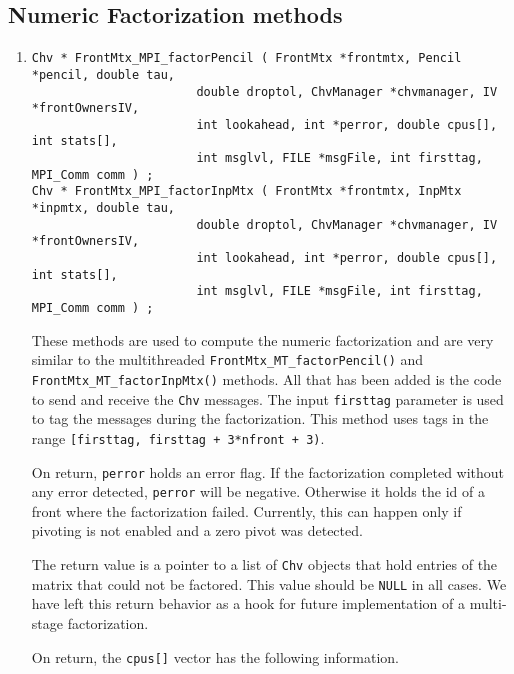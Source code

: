 \subsection{Numeric Factorization methods}
\label{subsection:MPI:proto:factor}
\par
\begin{enumerate}
\item
\begin{verbatim}
Chv * FrontMtx_MPI_factorPencil ( FrontMtx *frontmtx, Pencil *pencil, double tau, 
                       double droptol, ChvManager *chvmanager, IV *frontOwnersIV, 
                       int lookahead, int *perror, double cpus[], int stats[], 
                       int msglvl, FILE *msgFile, int firsttag, MPI_Comm comm ) ;
Chv * FrontMtx_MPI_factorInpMtx ( FrontMtx *frontmtx, InpMtx *inpmtx, double tau, 
                       double droptol, ChvManager *chvmanager, IV *frontOwnersIV, 
                       int lookahead, int *perror, double cpus[], int stats[], 
                       int msglvl, FILE *msgFile, int firsttag, MPI_Comm comm ) ;
\end{verbatim}
These methods are used to compute the numeric factorization
and are very similar to the multithreaded
{\tt FrontMtx\_MT\_factorPencil()} 
and {\tt FrontMtx\_MT\_factorInpMtx()} 
methods.
All that has been added is the code to send and receive 
the {\tt Chv} messages.
The input {\tt firsttag} parameter is used to tag the messages during
the factorization.
This method uses tags in the range 
{\tt [firsttag, firsttag + 3*nfront + 3)}.
\par
On return, {\tt *perror} holds an error flag.
If the factorization completed without any error detected, 
{\tt *perror} will be negative.
Otherwise it holds the id of a front where the factorization
failed.
Currently, this can happen only if pivoting is not enabled and a
zero pivot was detected.
\par
The return value is a pointer to a list of {\tt Chv} objects that
hold entries of the matrix that could not be factored.
This value should be {\tt NULL} in all cases.
We have left this return behavior as a hook for future
implementation of a multi-stage factorization.
\par
On return, the {\tt cpus[]} vector has the following information.
\begin{center}

\end{center}
\end{enumerate}
